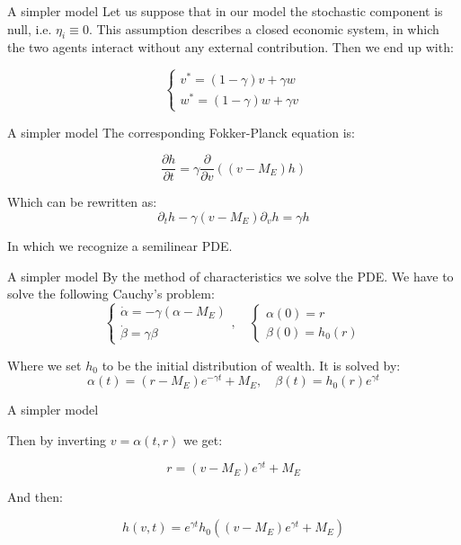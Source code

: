 \documentclass[10pt, compress]{beamer}
\begin{document}
\begin{frame}{A simpler model}
    Let us suppose that in our model the stochastic component is null, i.e. $\eta_i\equiv0$. This assumption describes a closed economic system, in which the two agents interact without any external contribution. Then we end up with:

\[\begin{cases}
v^{*}=\left(1-\gamma\right)v+\gamma w \\
w^{*}=\left(1-\gamma\right)w+\gamma v
\end{cases}\]


\end{frame}

\begin{frame}{A simpler model}
    The corresponding Fokker-Planck equation is:

\begin{equation*}
    \frac{\partial h}{\partial t}=\gamma\frac{\partial}{\partial v}((v-M_E)h)
\end{equation*}

Which can be rewritten as:
\begin{equation*}\label{eq2}
    \partial_th-\gamma (v-M_E)\partial_v h=\gamma h
\end{equation*}

In which we recognize a semilinear PDE. 
\end{frame}

\begin{frame}{A simpler model}
    By the method of characteristics we solve the PDE. We have to solve the following Cauchy's problem:
\[\begin{cases}
\dot{\alpha}=-\gamma (\alpha - M_E) \\
\dot{\beta}=\gamma \beta
\end{cases},\quad \begin{cases}
\alpha(0)=r \\
\beta(0)=h_0(r)
\end{cases}\]

Where we set $h_0$ to be the initial distribution of wealth. It is solved by:
    \[\alpha(t)=(r-M_E)e^{-\gamma t}+M_E,\quad \beta(t)=h_0(r)e^{\gamma t}\]
\end{frame}

\begin{frame}{A simpler model}

    Then by inverting $v=\alpha(t,r)$ we get:

\hspace{5mm}

\[r=(v-M_E)e^{\gamma t}+M_E\]

And then:

\hspace{5mm}

\[h(v,t)=e^{\gamma t}h_0\left((v-M_E)e^{\gamma t}+M_E\right)\]

\end{frame}
\end{document}

